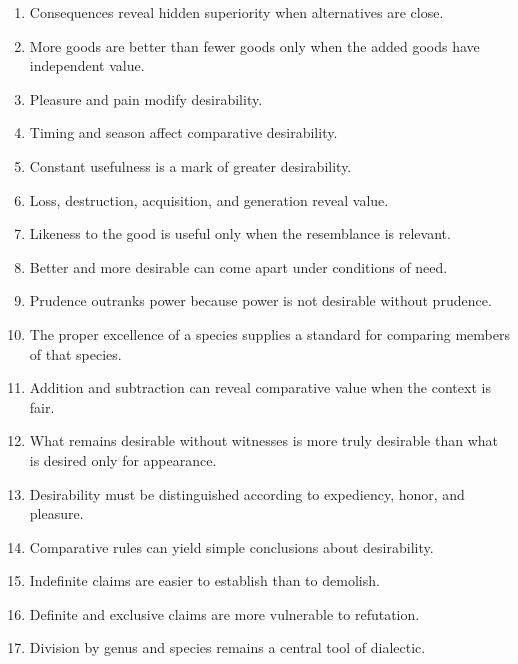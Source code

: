 \documentclass[12pt]{article}
\begin{document}
\begin{enumerate}[itemsep=0.5em]
    \item Consequences reveal hidden superiority when alternatives are close.

    \item More goods are better than fewer goods only when the added goods have
    independent value.

    \item Pleasure and pain modify desirability.

    \item Timing and season affect comparative desirability.

    \item Constant usefulness is a mark of greater desirability.

    \item Loss, destruction, acquisition, and generation reveal value.

    \item Likeness to the good is useful only when the resemblance is relevant.

    \item Better and more desirable can come apart under conditions of need.

    \item Prudence outranks power because power is not desirable without
    prudence.

    \item The proper excellence of a species supplies a standard for comparing
    members of that species.

    \item Addition and subtraction can reveal comparative value when the context
    is fair.

    \item What remains desirable without witnesses is more truly desirable than
    what is desired only for appearance.

    \item Desirability must be distinguished according to expediency, honor, and
    pleasure.

    \item Comparative rules can yield simple conclusions about desirability.

    \item Indefinite claims are easier to establish than to demolish.

    \item Definite and exclusive claims are more vulnerable to refutation.

    \item Division by genus and species remains a central tool of dialectic.
\end{enumerate}
\end{document}
